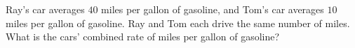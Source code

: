 Ray's car averages $40$ miles per gallon of gasoline, and Tom's car averages $10$ miles per gallon of gasoline. Ray and Tom each drive the same number of miles. What is the cars' combined rate of miles per gallon of gasoline?
